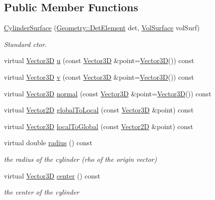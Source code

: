 \subsection*{Public Member Functions}
\begin{DoxyCompactItemize}
\item 
\hyperlink{class_d_d4hep_1_1_d_d_rec_1_1_cylinder_surface_a7820d49bdd82fe0e4c33dfa3953cd73a}{Cylinder\+Surface} (\hyperlink{class_d_d4hep_1_1_geometry_1_1_det_element}{Geometry\+::\+Det\+Element} det, \hyperlink{class_d_d4hep_1_1_d_d_rec_1_1_vol_surface}{Vol\+Surface} vol\+Surf)
\begin{DoxyCompactList}\small\item\em Standard c\textquotesingle{}tor. \end{DoxyCompactList}\item 
virtual \hyperlink{class_d_d_surfaces_1_1_vector3_d}{Vector3D} \hyperlink{class_d_d4hep_1_1_d_d_rec_1_1_cylinder_surface_a8b45bcd7d1ca8b8de3d3e5b509988224}{u} (const \hyperlink{class_d_d_surfaces_1_1_vector3_d}{Vector3D} \&point=\hyperlink{class_d_d_surfaces_1_1_vector3_d}{Vector3D}()) const
\item 
virtual \hyperlink{class_d_d_surfaces_1_1_vector3_d}{Vector3D} \hyperlink{class_d_d4hep_1_1_d_d_rec_1_1_cylinder_surface_a53dbbe89c9d1306d5cafb5a940b8d77f}{v} (const \hyperlink{class_d_d_surfaces_1_1_vector3_d}{Vector3D} \&point=\hyperlink{class_d_d_surfaces_1_1_vector3_d}{Vector3D}()) const
\item 
virtual \hyperlink{class_d_d_surfaces_1_1_vector3_d}{Vector3D} \hyperlink{class_d_d4hep_1_1_d_d_rec_1_1_cylinder_surface_aa995b70c3bfeaa1a21c61b917e4507c5}{normal} (const \hyperlink{class_d_d_surfaces_1_1_vector3_d}{Vector3D} \&point=\hyperlink{class_d_d_surfaces_1_1_vector3_d}{Vector3D}()) const
\item 
virtual \hyperlink{class_d_d_surfaces_1_1_vector2_d}{Vector2D} \hyperlink{class_d_d4hep_1_1_d_d_rec_1_1_cylinder_surface_a020b7f61ba490d05d9473250714d6d5f}{global\+To\+Local} (const \hyperlink{class_d_d_surfaces_1_1_vector3_d}{Vector3D} \&point) const
\item 
virtual \hyperlink{class_d_d_surfaces_1_1_vector3_d}{Vector3D} \hyperlink{class_d_d4hep_1_1_d_d_rec_1_1_cylinder_surface_a865ff9150e26d017de4357af5ea77d6b}{local\+To\+Global} (const \hyperlink{class_d_d_surfaces_1_1_vector2_d}{Vector2D} \&point) const
\item 
virtual double \hyperlink{class_d_d4hep_1_1_d_d_rec_1_1_cylinder_surface_a182ce2551b39f698df854755aa070066}{radius} () const
\begin{DoxyCompactList}\small\item\em the radius of the cylinder (rho of the origin vector) \end{DoxyCompactList}\item 
virtual \hyperlink{class_d_d_surfaces_1_1_vector3_d}{Vector3D} \hyperlink{class_d_d4hep_1_1_d_d_rec_1_1_cylinder_surface_a8043392b62836fcf8f4f0eca596721c9}{center} () const
\begin{DoxyCompactList}\small\item\em the center of the cylinder \end{DoxyCompactList}\end{DoxyCompactItemize}

